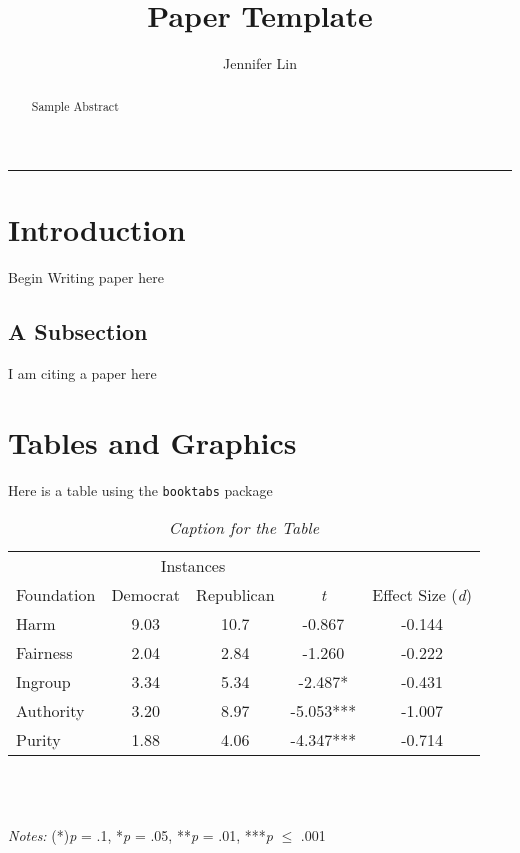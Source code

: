 \documentclass[12pt]{article}
\title{Paper Template}
\author{Jennifer Lin}
\affil{Northwestern University}
\date{} %
\newcommand\e{\emph} %
\newcommand\txt{\texttt} %
\begin{document}
\begin{singlespace}
	\maketitle
\end{singlespace}

\begin{singlespace}
\begin{abstract}
	Sample Abstract
\end{abstract}
\end{singlespace}

\begin{singlespace}
	\tableofcontents
\end{singlespace}

\noindent\rule[0.5ex]{\linewidth}{0.5pt}


\section{Introduction}

Begin Writing paper here

\subsection{A Subsection}

I am citing a paper here \cite{graham2009liberals}

\section{Tables and Graphics}

Here is a table using the \txt{booktabs} package

\begin{singlespace}

\begin{table}[H]
	\centering
	\caption{\e{Caption for the Table}}
	\label{table}
	\begin{tabular}{lcccc}
		\toprule
		&\multicolumn{2}{c}{Instances}&&\\
		\cmidrule{2-3}
		Foundation& Democrat &Republican &\e{t}& Effect Size (\e{d})\\
		\midrule
		Harm&9.03& 10.7&-0.867&-0.144\\
		Fairness&2.04&2.84&-1.260&-0.222\\
		Ingroup&3.34&5.34&-2.487*&-0.431\\
		Authority&3.20&8.97&-5.053***&-1.007\\
		Purity&1.88&4.06&-4.347***&-0.714\\
		\bottomrule
	\end{tabular} \\
	\begin{minipage}{10cm}
		~~\\
		\e{Notes:} 
		(*)\e{p} = .1, *\e{p} = .05, **\e{p} = .01, ***\e{p} $\leq$ .001
	\end{minipage}
\end{table}

\end{singlespace}
\end{document}
